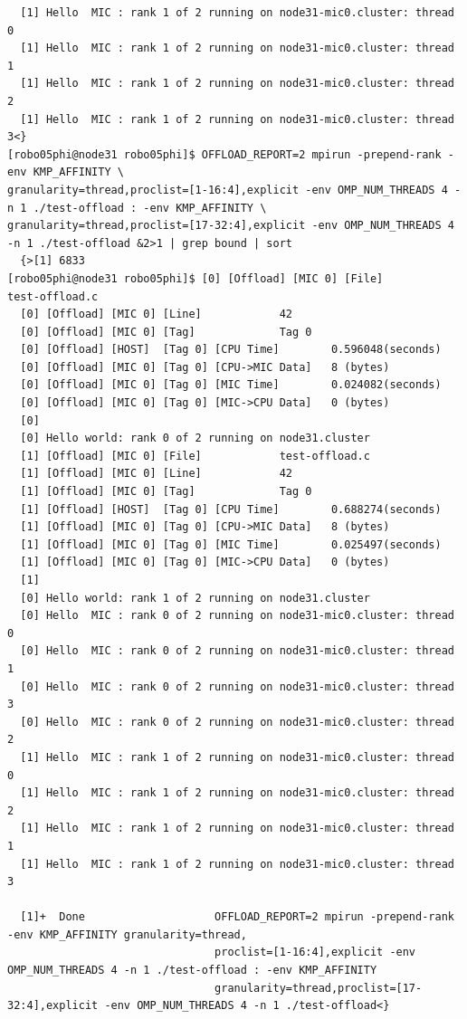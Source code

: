\documentclass[pscyr,10pt]{hedlab}
\begin{document}
\begin{lstlisting}
  [1] Hello  MIC : rank 1 of 2 running on node31-mic0.cluster: thread 0
  [1] Hello  MIC : rank 1 of 2 running on node31-mic0.cluster: thread 1
  [1] Hello  MIC : rank 1 of 2 running on node31-mic0.cluster: thread 2
  [1] Hello  MIC : rank 1 of 2 running on node31-mic0.cluster: thread 3<}
[robo05phi@node31 robo05phi]$ OFFLOAD_REPORT=2 mpirun -prepend-rank -env KMP_AFFINITY \
granularity=thread,proclist=[1-16:4],explicit -env OMP_NUM_THREADS 4 -n 1 ./test-offload : -env KMP_AFFINITY \
granularity=thread,proclist=[17-32:4],explicit -env OMP_NUM_THREADS 4 -n 1 ./test-offload &2>1 | grep bound | sort
  {>[1] 6833
[robo05phi@node31 robo05phi]$ [0] [Offload] [MIC 0] [File]            test-offload.c
  [0] [Offload] [MIC 0] [Line]            42
  [0] [Offload] [MIC 0] [Tag]             Tag 0
  [0] [Offload] [HOST]  [Tag 0] [CPU Time]        0.596048(seconds)
  [0] [Offload] [MIC 0] [Tag 0] [CPU->MIC Data]   8 (bytes)
  [0] [Offload] [MIC 0] [Tag 0] [MIC Time]        0.024082(seconds)
  [0] [Offload] [MIC 0] [Tag 0] [MIC->CPU Data]   0 (bytes)
  [0] 
  [0] Hello world: rank 0 of 2 running on node31.cluster
  [1] [Offload] [MIC 0] [File]            test-offload.c
  [1] [Offload] [MIC 0] [Line]            42
  [1] [Offload] [MIC 0] [Tag]             Tag 0
  [1] [Offload] [HOST]  [Tag 0] [CPU Time]        0.688274(seconds)
  [1] [Offload] [MIC 0] [Tag 0] [CPU->MIC Data]   8 (bytes)
  [1] [Offload] [MIC 0] [Tag 0] [MIC Time]        0.025497(seconds)
  [1] [Offload] [MIC 0] [Tag 0] [MIC->CPU Data]   0 (bytes)
  [1] 
  [0] Hello world: rank 1 of 2 running on node31.cluster
  [0] Hello  MIC : rank 0 of 2 running on node31-mic0.cluster: thread 0
  [0] Hello  MIC : rank 0 of 2 running on node31-mic0.cluster: thread 1
  [0] Hello  MIC : rank 0 of 2 running on node31-mic0.cluster: thread 3
  [0] Hello  MIC : rank 0 of 2 running on node31-mic0.cluster: thread 2
  [1] Hello  MIC : rank 1 of 2 running on node31-mic0.cluster: thread 0
  [1] Hello  MIC : rank 1 of 2 running on node31-mic0.cluster: thread 2
  [1] Hello  MIC : rank 1 of 2 running on node31-mic0.cluster: thread 1
  [1] Hello  MIC : rank 1 of 2 running on node31-mic0.cluster: thread 3
  
  [1]+  Done                    OFFLOAD_REPORT=2 mpirun -prepend-rank -env KMP_AFFINITY granularity=thread,
                                proclist=[1-16:4],explicit -env OMP_NUM_THREADS 4 -n 1 ./test-offload : -env KMP_AFFINITY
                                granularity=thread,proclist=[17-32:4],explicit -env OMP_NUM_THREADS 4 -n 1 ./test-offload<}
\end{lstlisting}
\end{document}
